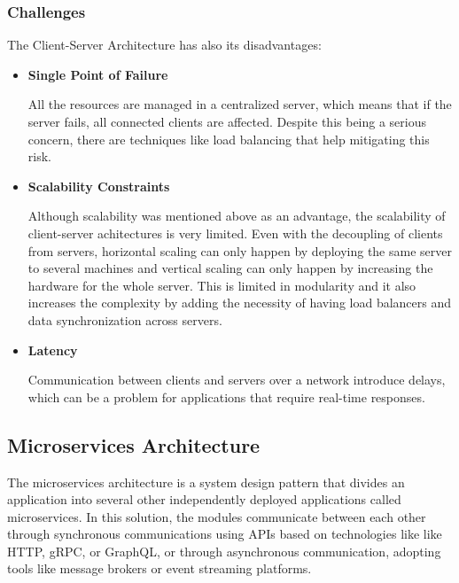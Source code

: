 \subsubsection{Challenges}
The Client-Server Architecture has also its disadvantages:
\begin{itemize}
	\item \textbf{Single Point of Failure}

	      All the resources are managed in a centralized server, which means that if
	      the server fails, all connected clients are affected. Despite this being a
	      serious concern, there are techniques like load balancing that help
	      mitigating this risk.

	\item \textbf{Scalability Constraints}

	      Although scalability was mentioned above as an advantage, the scalability
	      of client-server achitectures is very limited. Even with the decoupling of
	      clients from servers, horizontal scaling can only happen by deploying the
	      same server to several machines and vertical scaling can only happen by
	      increasing the hardware for the whole server. This is limited in modularity
	      and it also increases the complexity by adding the necessity of having
	      load balancers and data synchronization across servers.

	\item \textbf{Latency}

	      Communication between clients and servers over a network introduce delays,
	      which can be a problem for applications that require real-time
	      responses.

\end{itemize}

\subsection{Microservices Architecture}
The microservices architecture is a system design pattern that divides an
application into several other independently deployed applications called
microservices\cite{7436659}.
In this solution, the modules communicate between each other through
synchronous communications using APIs based on technologies like like
\gls{HTTP}, \gls{gRPC}, or GraphQL, or through asynchronous communication,
adopting tools like message brokers or event streaming platforms\cite{7436659}.

